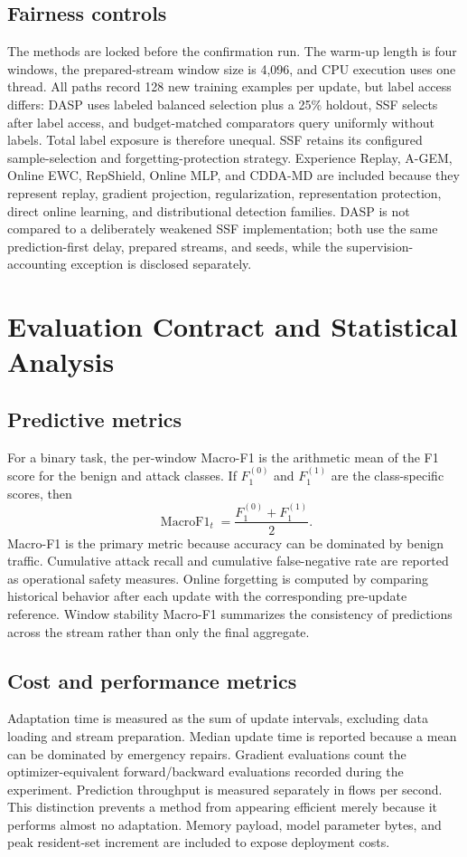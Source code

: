 \subsection{Fairness controls}
The methods are locked before the confirmation run. The warm-up length is four windows, the prepared-stream window size is 4,096, and CPU execution uses one thread. All paths record 128 new training examples per update, but label access differs: DASP uses labeled balanced selection plus a 25\% holdout, SSF selects after label access, and budget-matched comparators query uniformly without labels. Total label exposure is therefore unequal. SSF retains its configured sample-selection and forgetting-protection strategy. Experience Replay, A-GEM, Online EWC, RepShield, Online MLP, and CDDA-MD are included because they represent replay, gradient projection, regularization, representation protection, direct online learning, and distributional detection families. DASP is not compared to a deliberately weakened SSF implementation; both use the same prediction-first delay, prepared streams, and seeds, while the supervision-accounting exception is disclosed separately.

\section{Evaluation Contract and Statistical Analysis}
\label{sec:evaluation-contract}

\subsection{Predictive metrics}
For a binary task, the per-window Macro-F1 is the arithmetic mean of the F1 score for the benign and attack classes. If $F_1^{(0)}$ and $F_1^{(1)}$ are the class-specific scores, then
\begin{equation}
 \operatorname{MacroF1}_t=\frac{F_1^{(0)}+F_1^{(1)}}{2}.
\end{equation}
Macro-F1 is the primary metric because accuracy can be dominated by benign traffic. Cumulative attack recall and cumulative false-negative rate are reported as operational safety measures. Online forgetting is computed by comparing historical behavior after each update with the corresponding pre-update reference. Window stability Macro-F1 summarizes the consistency of predictions across the stream rather than only the final aggregate.

\subsection{Cost and performance metrics}
Adaptation time is measured as the sum of update intervals, excluding data loading and stream preparation. Median update time is reported because a mean can be dominated by emergency repairs. Gradient evaluations count the optimizer-equivalent forward/backward evaluations recorded during the experiment. Prediction throughput is measured separately in flows per second. This distinction prevents a method from appearing efficient merely because it performs almost no adaptation. Memory payload, model parameter bytes, and peak resident-set increment are included to expose deployment costs.

